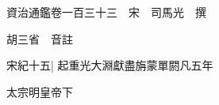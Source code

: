 






























































資治通鑑卷一百三十三　宋　司馬光　撰

胡三省　音註

宋紀十五|{
	起重光大淵獻盡旃蒙單閼凡五年}


太宗明皇帝下

